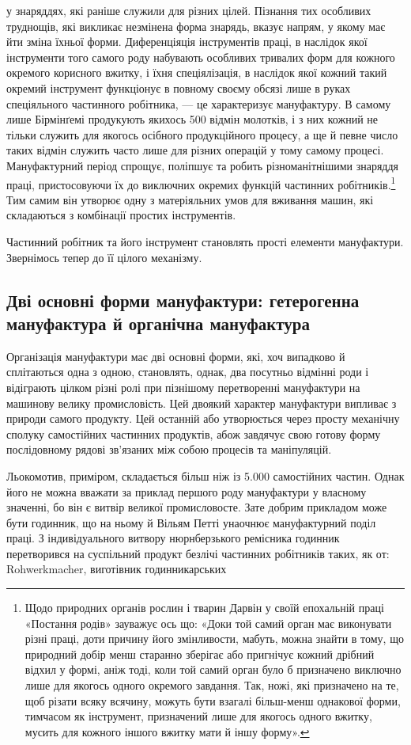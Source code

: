 \parcont{}  %
у знаряддях, які раніше служили для різних цілей. Пізнання
тих особливих труднощів, які викликає незмінена форма знарядь,
вказує напрям, у якому має йти зміна їхньої форми. Диференціяція
інструментів праці, в наслідок якої інструменти того самого роду
набувають особливих тривалих форм для кожного окремого
корисного вжитку, і їхня спеціялізація, в наслідок якої кожний
такий окремий інструмент функціонує в повному своєму обсязі
лише в руках спеціяльного частинного робітника, — це характеризує мануфактуру.
В самому лише Бірмінґемі продукують
якихось 500 відмін молотків, і з них кожний не тільки служить
для якогось осібного продукційного процесу, а ще й певне число
таких відмін служить часто лише для різних операцій у тому
самому процесі. Мануфактурний період спрощує, поліпшує та
робить різноманітнішими знаряддя праці, пристосовуючи їх до
виключних окремих функцій частинних робітників.\footnote{
Щодо природних органів рослин і тварин Дарвін у своїй епохальній праці
«Постання родів» зауважує ось що: «Доки той самий орган має виконувати різні
праці, доти причину його змінливости, мабуть, можна знайти в тому, що природний
добір менш старанно зберігає або пригнічує кожний дрібний відхил у
формі, аніж тоді, коли той самий орган було б призначено виключно лише для
якогось одного окремого завдання. Так, ножі, які призначено на те, щоб різати
всяку всячину, можуть бути взагалі більш-менш однакової форми, тимчасом як
інструмент, призначений лише для якогось одного вжитку, мусить для кожного
іншого вжитку мати й іншу форму».
} Тим самим він утворює одну з матеріяльних умов для вживання машин,
які складаються з комбінації простих інструментів.

Частинний робітник та його інструмент становлять прості
елементи мануфактури. Звернімось тепер до її цілого механізму.

\subsection{Дві основні форми мануфактури: гетерогенна мануфактура
й органічна мануфактура}

Організація мануфактури має дві основні форми, які, хоч
випадково й сплітаються одна з одною, становлять, однак, два
посутньо відмінні роди і відіграють цілком різні ролі при пізнішому перетворенні
мануфактури на машинову велику промисловість. Цей двоякий характер мануфактури
випливає з природи самого продукту. Цей останній або утворюється через просту
механічну сполуку самостійних частинних продуктів, абож
завдячує свою готову форму послідовному рядові зв’язаних між
собою процесів та маніпуляцій.

Льокомотив, приміром, складається більш ніж із 5.000 самостійних частин. Однак
його не можна вважати за приклад першого роду мануфактури у власному значенні,
бо він є витвір великої промисловосте. Зате добрим прикладом може бути годинник,
що на ньому й Вільям Петті унаочнює мануфактурний поділ праці. З індивідуального
витвору нюрнберзького ремісника годинник перетворився на суспільний продукт
безлічі частинних робітників
таких, як от: Rohwerkmacher, виготівник годинникарських
\parbreak{}  %
